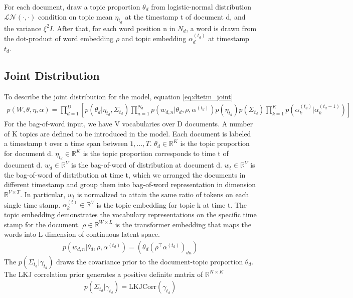For each document, draw a topic proportion $ \theta_{d} $ from logistic-normal distribution $ \mathcal{LN}(\cdot,\cdot) $ condition on topic mean $ \eta_{t_d} $ at the timestamp t of document d, and the variance $ \xi^2I $.
After that, for each word position n in $ N_d $, a word is drawn from the dot-product of word embedding $ \rho $ and topic embedding $ \alpha^{(t_d)}_{d} $ at timestamp $ t_d $. 
\subsection{Joint Distribution}
To describe the joint distribution for the model, equation \ref{eq:dtetm_joint}
\begin{align}\label{eq:dtetm_joint}
p(W,\theta,\eta,\alpha)=\prod_{d=1}^{D}\left[p(\theta_d|\eta_{t_d},\Sigma_{t_d})\prod_{n=1}^{N_d}p(w_{d,n}|\theta_d,\rho,\alpha^{(t_d)})p(\eta_{t_d})p(\Sigma_{t_d})\prod_{k=1}^{K}p(\alpha_k^{(t_d)}|\alpha_k^{(t_d-1)})\right]
\end{align}
For the bag-of-word input, we have V vocabularies over D documents. A number of K topics are defined to be introduced in the model. Each document is labeled a timestamp t over a time span between $ 1,\dots,T $.
$\theta_d\in\mathbb{R}^{K}$ is the topic proportion for document d.
$\eta_{t_d}\in\mathbb{R}^{K}$ is the topic proportion corresponds to time t of document d.	
$ w_d \in\mathbb{R}^{V}$ is the bag-of-word of distribution at document d.
$ w_t \in\mathbb{R}^{V}$ is the bag-of-word of distribution at time t, which we arranged the documents in different timestamp and group them into bag-of-word representation in dimension $ \mathbb{R}^{V\times T} $. In particular, $ w_t $ is normalized to attain the same ratio of tokens on each single time stamp.
$\alpha_k^{(t)}\in\mathbb{R}^{V}$ is the topic embedding for topic k at time t. The topic embedding demonstrates the vocabulary representations on the specific time stamp for the document.
$ \rho\in\mathbb{R}^{W\times L} $ is the transformer embedding that maps the words into L dimension of continuous latent space. 
\begin{align}
p(w_{d,n}|\theta_d,\rho,\alpha^{(t_d)})=(\theta_d(\rho^\top\alpha^{(t_d)})_{dn})
\end{align}
The $ p(\Sigma_{t_d}|\gamma_{t_d}) $ draws the covariance prior to the document-topic proportion $ \theta_d $. The LKJ correlation prior generates a positive definite matrix of $ \mathbb{R}^{K\times K} $
\begin{align}
p(\Sigma_{t_d}|\gamma_{t_d})=\text{LKJCorr}(\gamma_{t_d})
\end{align}
